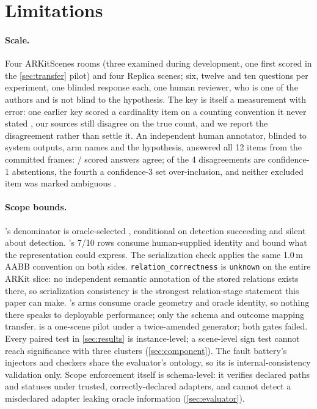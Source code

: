 \section{Limitations}
\label{sec:limitations}

\paragraph{Scale.}
Four ARKitScenes rooms (three examined during development, one first scored in the
\cref{sec:transfer} pilot) and four Replica scenes; six, twelve and ten questions per
experiment, one blinded response each, one human reviewer, who is one of the authors and is not blind to the hypothesis. The key
is itself a measurement with error: one earlier key scored a cardinality item on a
counting convention it never stated , our sources still disagree on the true
count, and we report the disagreement rather than settle it. An independent human annotator,
blinded to system outputs, arm names and the hypothesis, answered all 12 items from
the committed frames: \SRAnnScoredAgree{}/\SRAnnScoredOf{} scored answers agree;
\SRAnnAbstainDisagreements{} of the 4 disagreements are confidence-1 abstentions, the
fourth a confidence-3 set over-inclusion, and neither excluded item was marked
ambiguous .

\paragraph{Scope bounds.}
's denominator is oracle-selected , conditional on detection
succeeding and silent about detection. 's 7/10 rows 
consume human-supplied identity and bound what the representation could express. The
serialization check  applies the same 1.0\,m AABB convention on both sides.
\texttt{relation\_correctness} is \texttt{unknown} on the entire ARKit slice: no
independent semantic annotation of the stored relations exists there, so serialization
consistency is the strongest relation-stage statement this paper can make.
's arms
consume oracle geometry and oracle identity, so nothing there speaks to deployable
performance; only the schema and outcome mapping transfer.
 is a one-scene pilot under a twice-amended generator; both gates
failed. Every paired test in
\cref{sec:results} is instance-level; a scene-level sign test cannot reach significance
with three clusters (\cref{sec:component}). The fault battery's injectors and checkers
share the evaluator's ontology, so its \SRFaultLocalized{} is internal-consistency
validation only. Scope enforcement itself is schema-level: it verifies declared paths
and statuses under trusted, correctly-declared adapters, and cannot detect a
misdeclared adapter leaking oracle information (\cref{sec:evaluator}).


